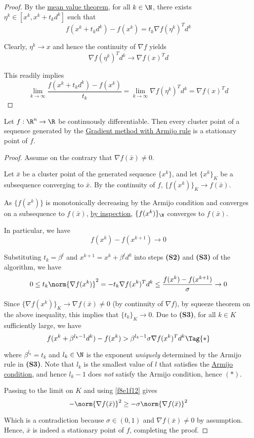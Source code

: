 \begin{proof}
  By the \href{d37aa2b}{mean value theorem}, for all $k\in\N$, there
  exists $\eta^k\in[x^k,x^k+t_kd^k]$ such that
  $$
    f(x^k+t_kd^k)-f(x^k)=t_k\nabla f(\eta^k)^Td^k
  $$

  Clearly, $\eta^k\to x$ and hence the continuity of $\nabla f$ yields
  $$
    \nabla f(\eta^k)^Td^k\to\nabla f(x)^Td
  $$

  This readily implies
  $$
    \lim_{k\to\infty}\frac{f(x^k+t_kd^k)-f(x^k)}{t_k}=
    \lim_{k\to\infty}\nabla f(\eta^k)^Td^k=
    \nabla f(x)^Td
  $$
\end{proof}

\label{bbb25cd}

Let $f:\R^n\to\R$ be continuously differentiable. Then every cluster point of a
sequence generated by the \href{ae01f6d}{Gradient method with Armijo rule} is a
stationary point of $f$.

\begin{proof}
  \def\xk{\{x^k\}}
  \def\grad#1{\nabla f(#1)}
  Assume on the contrary that $\grad{\bar x}\neq0$.

  Let $\bar x$ be a cluster point of the generated sequence $\xk$, and let
  $\xk_K$ be a subsequence converging to $\bar x$. By the continuity of $f$,
  $\{f(x^k)\}_K\to f(\bar x)$.

  As $\{f(x^k)\}$ is monotonically decreasing by the Armijo condition and
  converges on a subsequence to $f(\bar x)$, \href{aaf3ba6}{by inspection},
  $\{f(x^k)\}_\N$ converges to $f(\bar x)$.

  In particular, we have
  $$
    f(x^k)-f(x^{k+1})\to0
  $$

  Substituting $t_k=\beta^l$ and $x^{k+1}=x^k+\beta^ld^k$ into steps
  \textbf{(S2)} and \textbf{(S3)} of the algorithm, we have
  $$
    0\leq
    t_k\norm{\grad{x^k}}^2=
    -t_k\grad{x^k}^Td^k\leq
    \frac{f(x^k)-f(x^{k+1})}\sigma\to0
  $$

  Since $\{\grad{x^k}\}_K\to\grad{\bar x}\neq0$ (by continuity of $\nabla f$),
  by squeeze theorem on the above inequality, this implies that
  $\{t_k\}_K\to0$. Due to \textbf{(S3)}, for all $k\in K$ sufficiently large,
  we have
  \begin{equation*}
    f(x^k+\beta^{l_k-1}d^k)-f(x^k)>\beta^{l_k-1}\sigma\grad{x^k}^Td^k\Tag{*}
  \end{equation*}

  where $\beta^{l_k}=t_k$ and $l_k\in\N$ is the exponent \textit{uniquely}
  determined by the Armijo rule in \textbf{(S3)}. Note that $l_k$ is the
  smallest value of $l$ that satisfies the \href{fefb024}{Armijo condition},
  and hence $l_k-1$ does \textit{not} satisfy the Armijo condition, hence
  $(*)$.

  Passing to the limit on $K$ and using \autoref{f8e1f12} gives
  $$
    -\norm{\nabla f(\bar x)}^2\geq-\sigma\norm{\nabla f(\bar x)}^2
  $$

  Which is a contradiction because $\sigma\in(0,1)$ and $\nabla f(\bar x)\neq0$
  by assumption. Hence, $\bar x$ is indeed a stationary point of $f$,
  completing the proof.
\end{proof}


